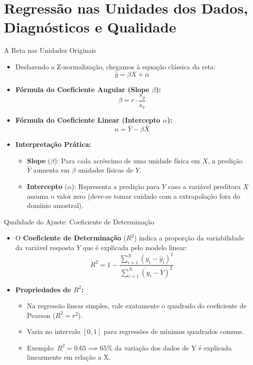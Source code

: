 \section{Regressão nas Unidades dos Dados, Diagnósticos e Qualidade}

\begin{frame}{A Reta nas Unidades Originais}
    \begin{itemize}
        \item Desfazendo a Z-normalização, chegamos à equação clássica da reta:
        $$\hat{y} = \beta X + \alpha$$
        \item \textbf{Fórmula do Coeficiente Angular (Slope $\beta$):}
        $$\beta = r \cdot \frac{s_y}{s_x}$$
        \item \textbf{Fórmula do Coeficiente Linear (Intercepto $\alpha$):}
        $$\alpha = \bar{Y} - \beta \bar{X}$$
        \item \textbf{Interpretação Prática:}
        \begin{itemize}
            \item \textbf{Slope} ($\beta$): Para cada acréscimo de uma unidade física em $X$, a predição $\hat{Y}$ aumenta em $\beta$ unidades físicas de $Y$.
            \item \textbf{Intercepto} ($\alpha$): Representa a predição para $Y$ caso a variável preditora $X$ assuma o valor zero (deve-se tomar cuidado com a extrapolação fora do domínio amostral).
        \end{itemize}
    \end{itemize}
\end{frame}

\begin{frame}{Qualidade do Ajuste: Coeficiente de Determinação}
    \begin{itemize}
        \item O \textbf{Coeficiente de Determinação} ($R^2$) indica a proporção da variabilidade da variável resposta $Y$ que é explicada pelo modelo linear:
        $$R^2 = 1 - \frac{\sum_{i=1}^N (y_i - \hat{y}_i)^2}{\sum_{i=1}^N (y_i - \bar{Y})^2}$$
        \item \textbf{Propriedades de $R^2$:}
        \begin{itemize}
            \item Na regressão linear simples, vale exatamente o quadrado do coeficiente de Pearson ($R^2 = r^2$).
            \item Varia no intervalo $[0, 1]$ para regressões de mínimos quadrados comuns.
            \item Exemplo: $R^2 = 0.65 \implies 65\%$ da variação dos dados de Y é explicada linearmente em relação a X.
        \end{itemize}
    \end{itemize}
\end{frame}

